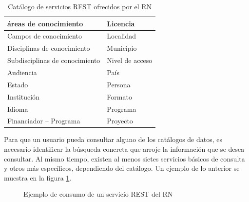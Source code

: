 \begin{table}[htbp]
\caption{Cat\'alogo de servicios REST ofrecidos por el RN} %
\begin{tabular}{| p{7cm}| p{7cm} |} \hline
\'areas de conocimiento          & Licencia                       \\ \hline
Campos de conocimiento         & Localidad                      \\ \hline
Disciplinas de conocimiento    & Municipio                      \\ \hline
Subdisciplinas de conocimiento & Nivel de acceso                \\ \hline
Audiencia                      & Pa\'is                           \\ \hline
Estado                         & Persona                        \\ \hline
Instituci\'on                    & Formato                        \\ \hline
Idioma                         & Programa                       \\ \hline
Financiador – Programa         & Proyecto                       \\ \hline
\end{tabular}

\label{descripcion_servicios_REST_RN}
\end{table}

Para que un usuario pueda consultar alguno de los cat\'alogos de datos, es necesario identificar la b\'usqueda concreta que arroje la informaci\'on que se desea consultar. Al mismo tiempo, existen al menos sietes servicios b\'asicos de consulta y otros m\'as espec\'ificos, dependiendo del cat\'alogo. Un ejemplo de lo anterior se muestra en la figura \ref{ejemplo_consumo_REST_RN}.

\begin{figure}[!ht]
    \centering
    \caption{Ejemplo de consumo de un servicio REST del RN} %
    \label{ejemplo_consumo_REST_RN}
\end{figure}

